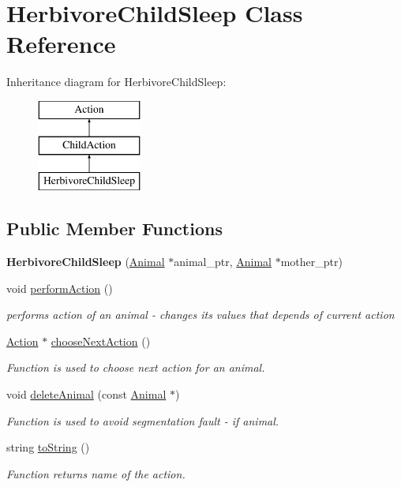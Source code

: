 \hypertarget{class_herbivore_child_sleep}{}\section{Herbivore\+Child\+Sleep Class Reference}
\label{class_herbivore_child_sleep}
Inheritance diagram for Herbivore\+Child\+Sleep\+:\begin{figure}[H]
\begin{center}
\leavevmode
\includegraphics[height=3.000000cm]{class_herbivore_child_sleep}
\end{center}
\end{figure}
\subsection*{Public Member Functions}
\begin{DoxyCompactItemize}
\item 
\hypertarget{class_herbivore_child_sleep_a3572b60d249a2b4b0e50cc01f11db670}{}{\bfseries Herbivore\+Child\+Sleep} (\hyperlink{class_animal}{Animal} $\ast$animal\+\_\+ptr, \hyperlink{class_animal}{Animal} $\ast$mother\+\_\+ptr)\label{class_herbivore_child_sleep_a3572b60d249a2b4b0e50cc01f11db670}

\item 
void \hyperlink{class_herbivore_child_sleep_afeffdc6f6dc5e18a63554b5f0bcb939b}{perform\+Action} ()
\begin{DoxyCompactList}\small\item\em performs action of an animal -\/ changes it\textquotesingle{}s values that depends of current action \end{DoxyCompactList}\item 
\hyperlink{class_action}{Action} $\ast$ \hyperlink{class_herbivore_child_sleep_aad20bdafd64ddb56a99d810953de76aa}{choose\+Next\+Action} ()
\begin{DoxyCompactList}\small\item\em Function is used to choose next action for an animal. \end{DoxyCompactList}\item 
void \hyperlink{class_herbivore_child_sleep_ac6c2c78f023c552cf90076f179256d5a}{delete\+Animal} (const \hyperlink{class_animal}{Animal} $\ast$)
\begin{DoxyCompactList}\small\item\em Function is used to avoid segmentation fault -\/ if animal. \end{DoxyCompactList}\item 
string \hyperlink{class_herbivore_child_sleep_a64f782ef578f2f97342819d25c96a410}{to\+String} ()
\begin{DoxyCompactList}\small\item\em Function returns name of the action. \end{DoxyCompactList}\end{DoxyCompactItemize}
